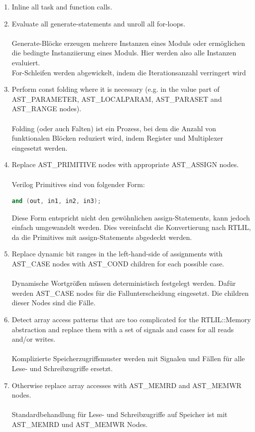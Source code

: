 \documentclass[11pt]{report}
\begin{document}
\begin{enumerate}
  
\item Inline all task and function calls.
\item Evaluate all generate-statements and unroll all for-loops.
\\
\\
Generate-Blöcke erzeugen mehrere Instanzen eines Moduls oder ermöglichen die bedingte Instanziierung eines Moduls. Hier werden also alle Instanzen evaluiert. \\
For-Schleifen werden abgewickelt, indem die Iterationsanzahl verringert wird



\item Perform const folding where it is necessary (e.g. in the value part of AST\_PARAMETER, AST\_LOCALPARAM, AST\_PARASET and AST\_RANGE nodes).
\\
\\
Folding (oder auch Falten) ist ein Prozess, bei dem die Anzahl von funktionalen Blöcken reduziert wird, indem Register und Multiplexer eingesetzt werden.

\item Replace AST\_PRIMITIVE nodes with appropriate AST\_ASSIGN nodes.
\\
\\
Verilog Primitives sind von folgender Form:
\begin{lstlisting}[language=C++]
	and (out, in1, in2, in3);
\end{lstlisting}
Diese Form entspricht nicht den gewöhnlichen assign-Statements, kann jedoch einfach umgewandelt werden. Dies vereinfacht die Konvertierung nach RTLIL, da die Primitives mit assign-Statements abgedeckt werden. 


\item Replace dynamic bit ranges in the left-hand-side of assignments with AST\_CASE nodes with AST\_COND
children for each possible case.
\\
\\
Dynamische Wortgrößen müssen deterministisch festgelegt werden.
Dafür werden AST\_CASE nodes für die Fallunterscheidung eingesetzt. Die children dieser Nodes sind die Fälle.

\item Detect array access patterns that are too complicated for the RTLIL::Memory abstraction and replace them with a set of signals and cases for all reads and/or writes.
\\
\\
Komplizierte Speicherzugriffsmuster werden mit Signalen und Fällen für alle Lese- und Schreibzugriffe ersetzt.
\item Otherwise replace array accesses with AST\_MEMRD and AST\_MEMWR nodes.
\\
\\
Standardbehandlung für Lese- und Schreibzugriffe auf Speicher ist mit AST\_MEMRD und AST\_MEMWR Nodes.

\end{enumerate}
\end{document}
